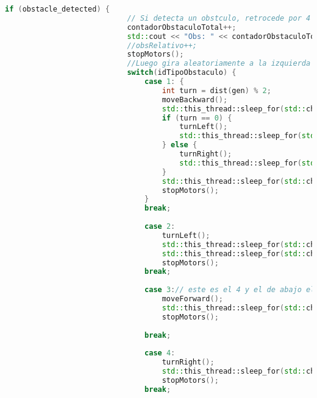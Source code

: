 \begin{lstlisting}[language={C++}, caption={Primer ajuste de c\'odigo}, label={Script}]
                        if (obstacle_detected) {
                            // Si detecta un obstculo, retrocede por 4 segundos
                            contadorObstaculoTotal++;
                            std::cout << "Obs: " << contadorObstaculoTotal << std::endl;
                            //obsRelativo++;
                            stopMotors();
                            //Luego gira aleatoriamente a la izquierda o derecha
                            switch(idTipoObstaculo) {
                                case 1: {
                                    int turn = dist(gen) % 2;
                                    moveBackward();
                                    std::this_thread::sleep_for(std::chrono::seconds(5));
                                    if (turn == 0) {
                                        turnLeft();
                                        std::this_thread::sleep_for(std::chrono::seconds(5));
                                    } else {
                                        turnRight();
                                        std::this_thread::sleep_for(std::chrono::seconds(5));
                                    }
                                    std::this_thread::sleep_for(std::chrono::seconds(2));
                                    stopMotors();
                                }
                                break;
                                
                                case 2:
                                    turnLeft();
                                    std::this_thread::sleep_for(std::chrono::seconds(5));
                                    std::this_thread::sleep_for(std::chrono::seconds(2));
                                    stopMotors();
                                break;
                                
                                case 3:// este es el 4 y el de abajo el 3
                                    moveForward();
                                    std::this_thread::sleep_for(std::chrono::seconds(2));
                                    stopMotors();
                                    
                                break;
                                
                                case 4:
                                    turnRight();
                                    std::this_thread::sleep_for(std::chrono::seconds(7));
                                    stopMotors();
                                break;
                                

\end{lstlisting}
